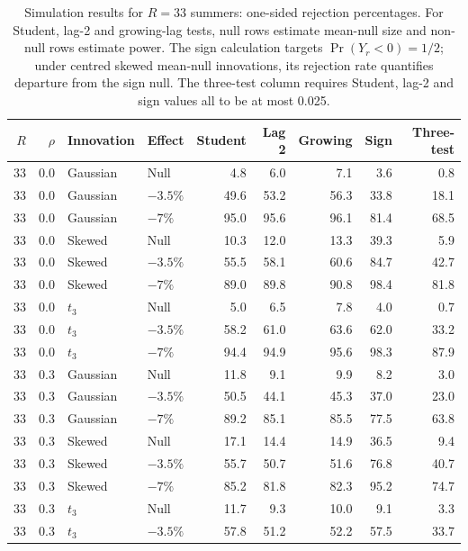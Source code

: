 \begin{table}[H]
\centering
\normalsize\renewcommand{\arraystretch}{1.55}\setlength{\tabcolsep}{4pt}
\caption{Simulation results for $R=33$ summers: one-sided rejection percentages. For Student, lag-2 and growing-lag tests, null rows estimate mean-null size and non-null rows estimate power. The sign calculation targets $\Pr(Y_r<0)=1/2$; under centred skewed mean-null innovations, its rejection rate quantifies departure from the sign null. The three-test column requires Student, lag-2 and sign values all to be at most 0.025.}
\label{tab:year-simulation-complete-c-r33}
\begin{tabular*}{\textwidth}{@{\extracolsep{\fill}}rrllrrrrr}
\toprule
$R$ & $\rho$ & Innovation & Effect & Student & Lag 2 & Growing & Sign & Three-test \\
\midrule
33 & 0.0 & Gaussian & Null & 4.8 & 6.0 & 7.1 & 3.6 & 0.8 \\
33 & 0.0 & Gaussian & $-3.5\%$ & 49.6 & 53.2 & 56.3 & 33.8 & 18.1 \\
33 & 0.0 & Gaussian & $-7\%$ & 95.0 & 95.6 & 96.1 & 81.4 & 68.5 \\
33 & 0.0 & Skewed & Null & 10.3 & 12.0 & 13.3 & 39.3 & 5.9 \\
33 & 0.0 & Skewed & $-3.5\%$ & 55.5 & 58.1 & 60.6 & 84.7 & 42.7 \\
33 & 0.0 & Skewed & $-7\%$ & 89.0 & 89.8 & 90.8 & 98.4 & 81.8 \\
33 & 0.0 & $t_3$ & Null & 5.0 & 6.5 & 7.8 & 4.0 & 0.7 \\
33 & 0.0 & $t_3$ & $-3.5\%$ & 58.2 & 61.0 & 63.6 & 62.0 & 33.2 \\
33 & 0.0 & $t_3$ & $-7\%$ & 94.4 & 94.9 & 95.6 & 98.3 & 87.9 \\
33 & 0.3 & Gaussian & Null & 11.8 & 9.1 & 9.9 & 8.2 & 3.0 \\
33 & 0.3 & Gaussian & $-3.5\%$ & 50.5 & 44.1 & 45.3 & 37.0 & 23.0 \\
33 & 0.3 & Gaussian & $-7\%$ & 89.2 & 85.1 & 85.5 & 77.5 & 63.8 \\
33 & 0.3 & Skewed & Null & 17.1 & 14.4 & 14.9 & 36.5 & 9.4 \\
33 & 0.3 & Skewed & $-3.5\%$ & 55.7 & 50.7 & 51.6 & 76.8 & 40.7 \\
33 & 0.3 & Skewed & $-7\%$ & 85.2 & 81.8 & 82.3 & 95.2 & 74.7 \\
33 & 0.3 & $t_3$ & Null & 11.7 & 9.3 & 10.0 & 9.1 & 3.3 \\
33 & 0.3 & $t_3$ & $-3.5\%$ & 57.8 & 51.2 & 52.2 & 57.5 & 33.7 \\

\end{tabular*}
\end{table}
